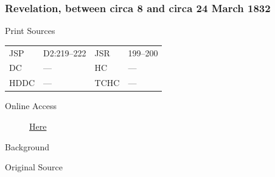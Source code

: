 		\subsubsection{Revelation, between circa 8 and circa 24 March 1832}
			\label{EMS-1832-JS-CIR-8-MAR-1832}
		
			\begin{description}
				\item[Print Sources]
			\end{description}

				\begin{tabular}{p{0.5in}p{1in}p{0.5in}p{1in}}
				JSP	 	& D2:219--222	& JSR 		& 199--200 \\
				DC	 	& ---		 	& HC 		& --- \\
				HDDC 	& ---			& TCHC 		& --- \\
				\end{tabular}
			
			\begin{description}
				\item[Online Access] \href{https://www.josephsmithpapers.org/paper-summary/revelation-between-circa-8-and-circa-24-march-1832/1}{Here}
			\end{description}
			
			\begin{description}
				\item[Background]
			\end{description}
			
			
			\begin{description}
				\item[Original Source]
			\end{description}
			
			
